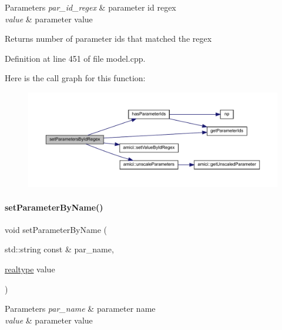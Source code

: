 \begin{DoxyParams}{Parameters}
{\em par\+\_\+id\+\_\+regex} & parameter id regex \\
\hline
{\em value} & parameter value \\
\hline
\end{DoxyParams}
\begin{DoxyReturn}{Returns}
number of parameter ids that matched the regex 
\end{DoxyReturn}


Definition at line 451 of file model.\+cpp.

Here is the call graph for this function\+:
\nopagebreak
\begin{figure}[H]
\begin{center}
\leavevmode
\includegraphics[width=350pt]{classamici_1_1_model_ab66d6b754637ed68449af96f5887a0be_cgraph}
\end{center}
\end{figure}
\mbox{\label{classamici_1_1_model_a6c5ceb2ba684cf68a7f21ad865091200}} 
\paragraph{\texorpdfstring{setParameterByName()}{setParameterByName()}}
{\footnotesize\ttfamily void set\+Parameter\+By\+Name (\begin{DoxyParamCaption}\item[{std\+::string const \&}]{par\+\_\+name,  }\item[{\mbox{\hyperlink{namespaceamici_a1bdce28051d6a53868f7ccbf5f2c14a3}{realtype}}}]{value }\end{DoxyParamCaption})}


\begin{DoxyParams}{Parameters}
{\em par\+\_\+name} & parameter name \\
\hline
{\em value} & parameter value \\
\hline
\end{DoxyParams}


